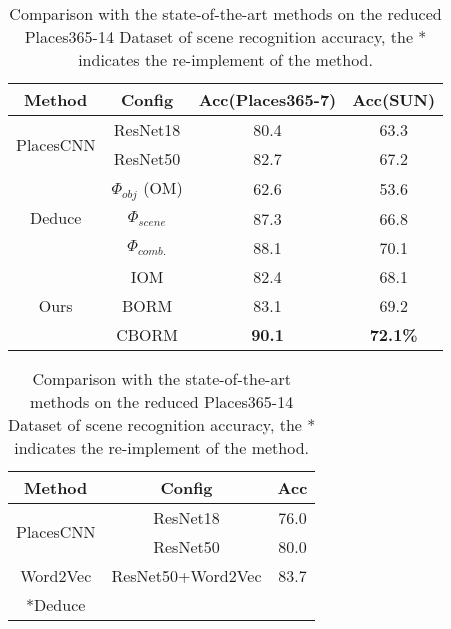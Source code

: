 \begin{table}[htbp]
	\centering
	\scriptsize
	\begin{minipage}[t]{.44\textwidth}
		\centering
		\caption{Comparison with the state-of-the-art methods on the reduced Places365-7 Dataset and SUN dataset of scene recognition accuracy}
		\label{tab:place365_7_sota}
		\begin{tabular}{c|ccc}
			\hline
			Method     & Config   & Acc(Places365-7) & Acc(SUN) \\ \hline
			\multirow{2}{*}{PlacesCNN \cite{zhou2017places}}     & ResNet18 & 80.4  & 63.3  \\
			& ResNet50 & 82.7 & 67.2   \\ \hline
			\multirow{3}{*}{Deduce \cite{pal2019deduce}}     &  $\Phi_{obj}$ (OM)      & 62.6 & 53.6      \\
			& $\Phi_{scene}$    & 87.3 & 66.8    \\
			& $\Phi_{comb.}$ & 88.1 & 70.1    \\ \hline
			\multirow{3}{*}{Ours} 	
			& IOM  & 82.4 & 68.1   \\
			& BORM & 83.1 & 69.2   \\ \cdashline{2-4}
			& CBORM& \textbf{90.1} & \textbf{72.1\%}   \\	\hline
		\end{tabular}
	\end{minipage}

	\hspace{1cm}

	\begin{minipage}[t]{.44\textwidth}
		\centering
		\caption{Comparison with the state-of-the-art methods on the reduced Places365-14 Dataset of scene recognition accuracy, the * indicates the re-implement of the method. }
		\label{tab:place365_14_sota}
		\begin{tabular}{c|cc}
			\hline
			Method                    & Config           & Acc \\ \hline
			\multirow{2}{*}{PlacesCNN \cite{zhou2017places}}     & ResNet18 & 76.0  \\
			& ResNet50 & 80.0   \\ \hline
			\multirow{1}{*}{Word2Vec \cite{chen2019scene}} 
			& ResNet50+Word2Vec         & 83.7    \\ \hline
            \multirow{1}{*}{{*}Deduce \cite{pal2019deduce}} 
            

\end{tabular}
\end{minipage}
\end{table}
